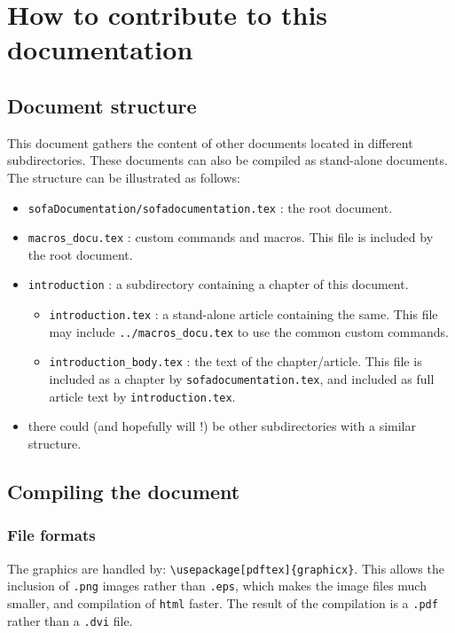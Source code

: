 \documentclass[a4paper,10pt]{report}
\begin{document}
\chapter{How to contribute to this documentation}
\section{Document structure}
This document gathers the content of other documents located in different subdirectories. These documents can also be compiled as stand-alone documents.
The structure can be illustrated as follows:
\begin{itemize}
 \item \texttt{sofaDocumentation/sofadocumentation.tex} : the root document.
 \item \texttt{macros\_docu.tex} : custom commands and macros. This file is included by the root document.
 \item \texttt{introduction} : a subdirectory containing a chapter of this document.
\begin{itemize}
 \item \texttt{introduction.tex} : a stand-alone article containing the same. This file may include \texttt{../macros\_docu.tex} to use the common custom commands.
 \item \texttt{introduction\_body.tex} : the text of the chapter/article. This file is included as a chapter by \texttt{sofadocumentation.tex}, and included as full article text by \texttt{introduction.tex}.
\end{itemize}
 \item there could (and hopefully will !) be other subdirectories with a similar structure.
\end{itemize}

\section{Compiling the document}
\subsection{File formats}
The graphics are handled by: \texttt{\textbackslash usepackage[pdftex]\{graphicx\}}. This allows the inclusion of \texttt{.png} images rather than \texttt{.eps}, which makes the image files much smaller, and compilation of \texttt{html} faster. The result of the compilation is a \texttt{.pdf} rather than a \texttt{.dvi} file.
\end{document}
